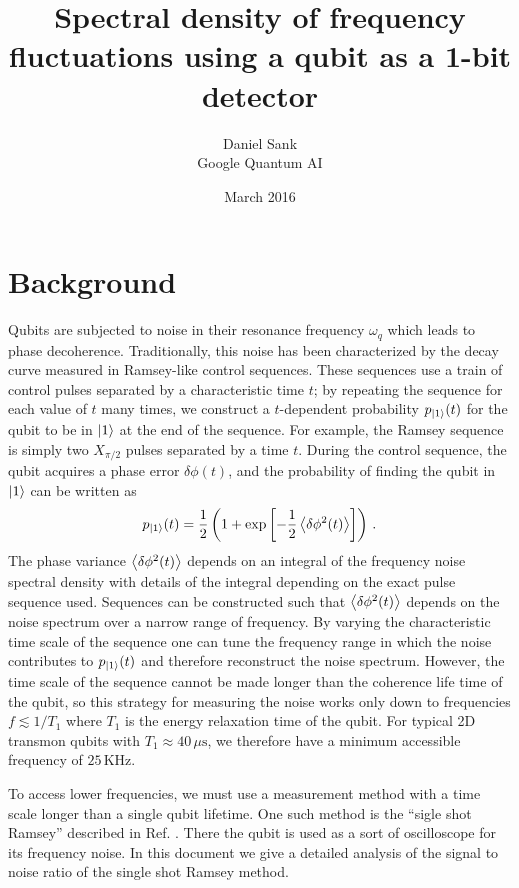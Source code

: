 \documentclass[twocolumn]{article}
\author{Daniel Sank \\ \small{Google Quantum AI}}
\title{Spectral density of frequency fluctuations using a qubit as a 1-bit detector}
\date{March 2016}
\begin{document}
\maketitle

\section{Background}

Qubits are subjected to noise in their resonance frequency $\omega_q$ which leads to phase decoherence.
Traditionally, this noise has been characterized by the decay curve measured in Ramsey-like control sequences.
These sequences use a train of control pulses separated by a characteristic time $t$; by repeating the sequence for each value of $t$ many times, we construct a $t$-dependent probability $p_{| 1 \rangle}(t)$ for the qubit to be in $| 1 \rangle$ at the end of the sequence.
For example, the Ramsey sequence is simply two $X_{\pi/2}$ pulses separated by a time $t$.
During the control sequence, the qubit acquires a phase error $\delta \phi(t)$, and the probability of finding the qubit in $| 1 \rangle$ can be written as
\begin{equation}
p_{| 1 \rangle}(t) = \frac{1}{2} \left( 1 + \exp \left[ - \frac{1}{2} \left \langle  \delta \phi^2(t) \right \rangle \right] \right) \, .
\end{equation}
The phase variance $\left \langle \delta \phi^2 (t) \right \rangle$ depends on an integral of the frequency noise spectral density with details of the integral depending on the exact pulse sequence used.
Sequences can be constructed such that $\left \langle \delta \phi^2(t) \right \rangle$ depends on the noise spectrum over a narrow range of frequency.
By varying the characteristic time scale of the sequence one can tune the frequency range in which the noise contributes to $p_{| 1 \rangle}(t)$ and therefore reconstruct the noise spectrum.
However, the time scale of the sequence cannot be made longer than the coherence life time of the qubit, so this strategy for measuring the noise works only down to frequencies $f \lesssim 1/T_1$ where $T_1$ is the energy relaxation time of the qubit.
For typical 2D transmon qubits with $T_1 \approx 40\,\mu\text{s}$, we therefore have a minimum accessible frequency of $25\,\text{KHz}$.

To access lower frequencies, we must use a measurement method with a time scale longer than a single qubit lifetime.
One such method is the ``sigle shot Ramsey'' described in Ref. \cite{Yan}.
There the qubit is used as a sort of oscilloscope for its frequency noise.
In this document we give a detailed analysis of the signal to noise ratio of the single shot Ramsey method.
\end{document}
